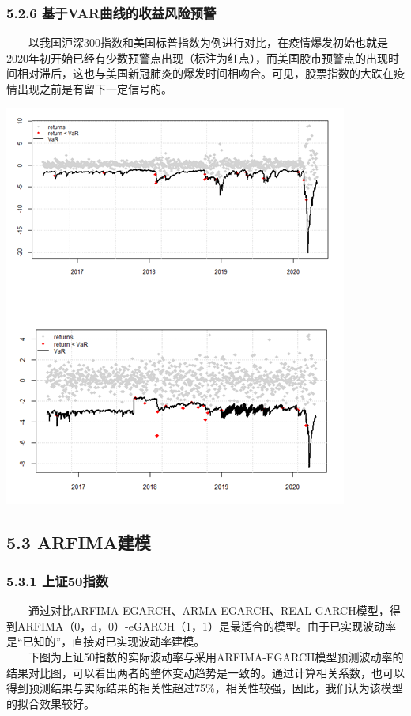 \documentclass[
  11pt,
  letterpaper,
]{article}
\begin{document}
\hypertarget{ux57faux4e8evarux66f2ux7ebfux7684ux6536ux76caux98ceux9669ux9884ux8b66}{%
\subsubsection{5.2.6
基于VAR曲线的收益风险预警}\label{ux57faux4e8evarux66f2ux7ebfux7684ux6536ux76caux98ceux9669ux9884ux8b66}}

  以我国沪深300指数和美国标普指数为例进行对比，在疫情爆发初始也就是2020年初开始已经有少数预警点出现（标注为红点），而美国股市预警点的出现时间相对滞后，这也与美国新冠肺炎的爆发时间相吻合。可见，股票指数的大跌在疫情出现之前是有留下一定信号的。

\includegraphics[width=0.7\linewidth]{./14}

\hypertarget{arfimaux5efaux6a21}{%
\subsection{5.3 ARFIMA建模}\label{arfimaux5efaux6a21}}

\hypertarget{ux4e0aux8bc150ux6307ux6570}{%
\subsubsection{5.3.1 上证50指数}\label{ux4e0aux8bc150ux6307ux6570}}

  通过对比ARFIMA-EGARCH、ARMA-EGARCH、REAL-GARCH模型，得到ARFIMA（0，d，0）-eGARCH（1，1）是最适合的模型。由于已实现波动率是``已知的''，直接对已实现波动率建模。\\
  下图为上证50指数的实际波动率与采用ARFIMA-EGARCH模型预测波动率的结果对比图，可以看出两者的整体变动趋势是一致的。通过计算相关系数，也可以得到预测结果与实际结果的相关性超过75\%，相关性较强，因此，我们认为该模型的拟合效果较好。
\end{document}
